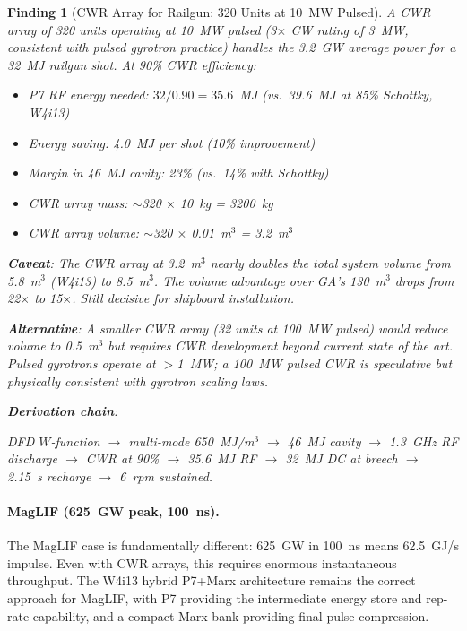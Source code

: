 \documentclass[11pt]{article}
\newtheorem{finding}{Finding}
\begin{document}
\begin{finding}[CWR Array for Railgun: 320 Units at 10~MW Pulsed]
\label{find:CWR-railgun}
A CWR array of 320 units operating at 10~MW pulsed (3$\times$ CW
rating of 3~MW, consistent with pulsed gyrotron practice) handles
the 3.2~GW average power for a 32~MJ railgun shot. At 90\% CWR
efficiency:
\begin{itemize}[nosep]
  \item P7 RF energy needed: $32/0.90 = 35.6$~MJ (vs.\ 39.6~MJ
    at 85\% Schottky, W4i13)
  \item Energy saving: 4.0~MJ per shot (10\% improvement)
  \item Margin in 46~MJ cavity: 23\% (vs.\ 14\% with Schottky)
  \item CWR array mass: $\sim$320 $\times$ 10~kg = 3200~kg
  \item CWR array volume: $\sim$320 $\times$ 0.01~m$^3$ = 3.2~m$^3$
\end{itemize}

\textbf{Caveat}: The CWR array at 3.2~m$^3$ nearly doubles the total
system volume from 5.8~m$^3$ (W4i13) to 8.5~m$^3$. The volume
advantage over GA's 130~m$^3$ drops from 22$\times$ to 15$\times$.
Still decisive for shipboard installation.

\textbf{Alternative}: A smaller CWR array (32 units at 100~MW pulsed)
would reduce volume to 0.5~m$^3$ but requires CWR development beyond
current state of the art. Pulsed gyrotrons operate at $>$1~MW; a
100~MW pulsed CWR is speculative but physically consistent with
gyrotron scaling laws.

\textbf{Derivation chain}:
\begin{center}
DFD $W$-function $\to$ multi-mode 650~MJ/m$^3$ $\to$ 46~MJ cavity
$\to$ 1.3~GHz RF discharge $\to$ CWR at 90\% $\to$ 35.6~MJ RF
$\to$ 32~MJ DC at breech $\to$ 2.15~s recharge $\to$ 6~rpm sustained.
\end{center}
\end{finding}

\paragraph{MagLIF (625~GW peak, 100~ns).}
The MagLIF case is fundamentally different: 625~GW in 100~ns means
62.5~GJ/s impulse. Even with CWR arrays, this requires enormous
instantaneous throughput. The W4i13 hybrid P7+Marx architecture
remains the correct approach for MagLIF, with P7 providing the
intermediate energy store and rep-rate capability, and a compact
Marx bank providing final pulse compression.
\end{document}
